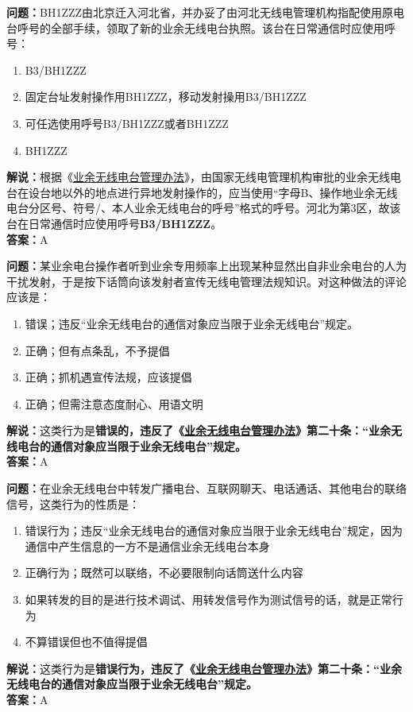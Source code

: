 \textbf{问题：}BH1ZZZ由北京迁入河北省，并办妥了由河北无线电管理机构指配使用原电台呼号的全部手续，领取了新的业余无线电台执照。该台在日常通信时应使用呼号：
\begin{enumerate}[label=\Alph*), leftmargin=1.5cm]
	\item B3/BH1ZZZ
	\item 固定台址发射操作用BH1ZZZ，移动发射操用B3/BH1ZZZ
	\item 可任选使用呼号B3/BH1ZZZ或者BH1ZZZ
	\item BH1ZZZ
\end{enumerate}
\textbf{解说：}根据《\href{https://www.miit.gov.cn/jgsj/zfs/bmgz/art/2020/art_147b69815b3641caad9047735f94c860.html}{业余无线电台管理办法}》，由国家无线电管理机构审批的业余无线电台在设台地以外的地点进行异地发射操作的，应当使用“字母B、操作地业余无线电台分区号、符号/、本人业余无线电台的呼号”格式的呼号。河北为第3区，故该台在日常通信时应使用呼号\textbf{B3/BH1ZZZ}。\\\textbf{答案：}A


\textbf{问题：}某业余电台操作者听到业余专用频率上出现某种显然出自非业余电台的人为干扰发射，于是按下话筒向该发射者宣传无线电管理法规知识。对这种做法的评论应该是：
\begin{enumerate}[label=\Alph*), leftmargin=1.5cm]
	\item 错误；违反“业余无线电台的通信对象应当限于业余无线电台”规定。
	\item 正确；但有点条乱，不予提倡
	\item 正确；抓机遇宣传法规，应该提倡
	\item 正确；但需注意态度耐心、用语文明
\end{enumerate}
\textbf{解说：}这类行为是\textbf{错误的，违反了《\href{https://www.miit.gov.cn/jgsj/zfs/bmgz/art/2020/art_147b69815b3641caad9047735f94c860.html}{业余无线电台管理办法}》第二十条：“业余无线电台的通信对象应当限于业余无线电台”规定。}\\\textbf{答案：}A


\textbf{问题：}在业余无线电台中转发广播电台、互联网聊天、电话通话、其他电台的联络信号，这类行为的性质是：
\begin{enumerate}[label=\Alph*), leftmargin=1.5cm]
	\item 错误行为；违反“业余无线电台的通信对象应当限于业余无线电台”规定，因为通信中产生信息的一方不是通信业余无线电台本身
	\item 正确行为；既然可以联络，不必要限制向话筒送什么内容
	\item 如果转发的目的是进行技术调试、用转发信号作为测试信号的话，就是正常行为
	\item 不算错误但也不值得提倡
\end{enumerate}
\textbf{解说：}这类行为是\textbf{错误行为，违反了《\href{https://www.miit.gov.cn/jgsj/zfs/bmgz/art/2020/art_147b69815b3641caad9047735f94c860.html}{业余无线电台管理办法}》第二十条：“业余无线电台的通信对象应当限于业余无线电台”规定。}\\\textbf{答案：}A

